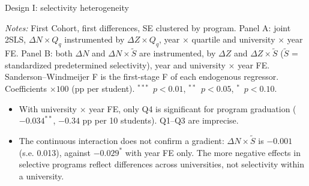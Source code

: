 \documentclass{beamer}
\newcommand{\sym}[1]{\ensuremath{^{#1}}}
\begin{document}
\begin{frame}{Design I: selectivity heterogeneity}
\centering
\scriptsize
\resizebox{0.8\linewidth}{!}{}

\vspace{0.08cm}
\parbox{0.97\textwidth}{\tiny
\textit{Notes:} First Cohort, first differences, SE clustered by program. Panel A: joint 2SLS, $\Delta N\times Q_q$ instrumented by $\Delta Z\times Q_q$, year $\times$ quartile and
university $\times$ year FE. Panel B: both $\Delta N$ and $\Delta N\times\tilde S$ are instrumented, by $\Delta Z$ and $\Delta Z\times\tilde S$ ($\tilde S$ = standardized predetermined selectivity), year and university $\times$ year FE.
Sanderson--Windmeijer F is the first-stage F of each endogenous regressor. Coefficients $\times 100$ (pp per student).
\sym{***}~$p<0.01$, \sym{**}~$p<0.05$, \sym{*}~$p<0.10$.}

\vspace{0.1cm}
\begin{itemize}\scriptsize
    \setlength{\itemsep}{1pt}
    \item With university $\times$ year FE, only Q4 is significant for program graduation ($-0.034^{**}$, $-0.34$ pp per 10 students). Q1--Q3 are imprecise.
    \item The continuous interaction does not confirm a gradient: $\Delta N\times\tilde S$ is $-0.001$ (s.e. 0.013), against $-0.029^{*}$ with year FE only.
    The more negative effects in selective programs reflect differences across universities, not selectivity within a university.
\end{itemize}
\end{frame}
\end{document}
